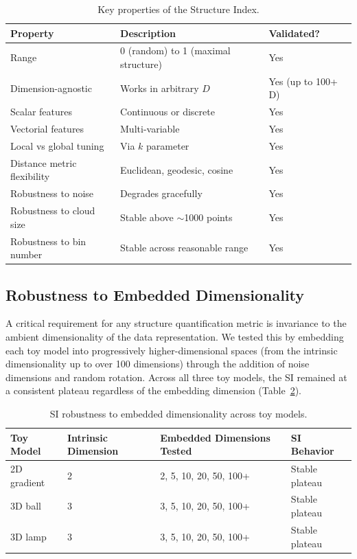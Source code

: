 \documentclass[12pt]{article}
\begin{document}
\begin{table}[htbp]
\centering
\caption{Key properties of the Structure Index.}
\label{tab:properties}
\begin{tabular}{lll}
\toprule
Property & Description & Validated? \\
\midrule
Range & 0 (random) to 1 (maximal structure) & Yes \\
Dimension-agnostic & Works in arbitrary $D$ & Yes (up to 100+ D) \\
Scalar features & Continuous or discrete & Yes \\
Vectorial features & Multi-variable & Yes \\
Local vs global tuning & Via $k$ parameter & Yes \\
Distance metric flexibility & Euclidean, geodesic, cosine & Yes \\
Robustness to noise & Degrades gracefully & Yes \\
Robustness to cloud size & Stable above $\sim$1000 points & Yes \\
Robustness to bin number & Stable across reasonable range & Yes \\
\bottomrule
\end{tabular}
\end{table}

\subsection{Robustness to Embedded Dimensionality}

A critical requirement for any structure quantification metric is invariance to the ambient dimensionality of the data representation. We tested this by embedding each toy model into progressively higher-dimensional spaces (from the intrinsic dimensionality up to over 100 dimensions) through the addition of noise dimensions and random rotation. Across all three toy models, the SI remained at a consistent plateau regardless of the embedding dimension (Table~\ref{tab:dimensionality}).

\begin{table}[htbp]
\centering
\caption{SI robustness to embedded dimensionality across toy models.}
\label{tab:dimensionality}
\begin{tabular}{llll}
\toprule
Toy Model & Intrinsic Dimension & Embedded Dimensions Tested & SI Behavior \\
\midrule
2D gradient & 2 & 2, 5, 10, 20, 50, 100+ & Stable plateau \\
3D ball & 3 & 3, 5, 10, 20, 50, 100+ & Stable plateau \\
3D lamp & 3 & 3, 5, 10, 20, 50, 100+ & Stable plateau \\
\bottomrule
\end{tabular}
\end{table}
\end{document}

